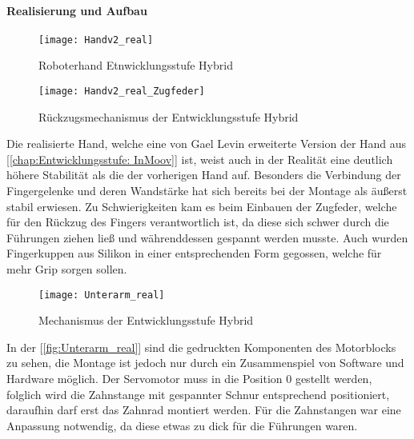 \documentclass[titlepage,12pt,twoside]{article}
\begin{document}
\paragraph{Realisierung und Aufbau}
\hfill \break
\hfill \break
\begin{figure}[H]
	\begin{center}
		\scalebox{0.5}
		{\texttt{[image: Handv2\_real]}}
		\caption{Roboterhand Etnwicklungsstufe Hybrid}
		\label{fig:Handv2_real}			
	\end{center}
\end{figure}
\begin{figure}[H]
	\begin{center}
		\scalebox{0.5}
		{\texttt{[image: Handv2\_real\_Zugfeder]}}
		\caption{Rückzugsmechanismus der Entwicklungsstufe Hybrid}
		\label{fig:Handv2_real_Zugfeder}			
	\end{center}
\end{figure}
\hfill \break
Die realisierte Hand, welche eine von Gael Levin erweiterte Version der Hand aus
[\textcolor{blue}{\autoref{chap:Entwicklungsstufe: InMoov}}] ist, weist auch in der Realität eine 
deutlich höhere Stabilität als die der vorherigen Hand auf. Besonders die 
Verbindung der Fingergelenke und deren Wandstärke hat sich bereits bei der Montage 
als äußerst stabil erwiesen. Zu Schwierigkeiten kam es beim Einbauen der Zugfeder, 
welche für den Rückzug des Fingers verantwortlich ist, da diese sich schwer durch 
die Führungen ziehen ließ und währenddessen gespannt werden musste. Auch wurden 
Fingerkuppen aus Silikon in einer entsprechenden Form gegossen, welche für mehr 
Grip sorgen sollen. \\
\begin{figure}[H]
	\begin{center}
		\scalebox{1}
		{\texttt{[image: Unterarm\_real]}}
		\caption{Mechanismus der Entwicklungsstufe Hybrid}
		\label{fig:Unterarm_real}			
	\end{center}
\end{figure}
\hfill \break
In der [\textcolor{blue}{\autoref{fig:Unterarm_real}}] sind die gedruckten Komponenten des Motorblocks 
zu sehen, die Montage ist jedoch nur durch ein Zusammenspiel von Software und 
Hardware möglich. Der Servomotor muss in die Position 0 gestellt werden, folglich 
wird die Zahnstange mit gespannter Schnur entsprechend positioniert, daraufhin 
darf erst das Zahnrad montiert werden. Für die Zahnstangen war eine Anpassung 
notwendig, da diese etwas zu dick für die Führungen waren. \\
\end{document}
